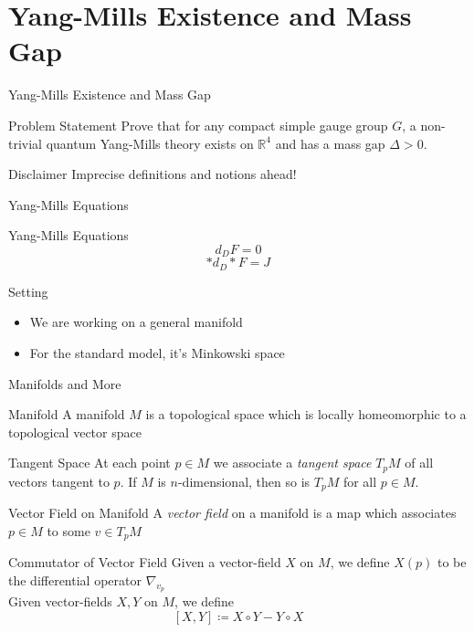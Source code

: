\documentclass[handout]{beamer}
\newcommand{\Real}{\mathbb{R}}
\begin{document}
  \section{Yang-Mills Existence and Mass Gap}
  \begin{frame}{Yang-Mills Existence and Mass Gap}
      \begin{block}{Problem Statement}
          Prove that for any compact simple gauge group $G$, a non-trivial
          quantum Yang-Mills theory exists on $\Real^4$ and has a mass gap
          $\Delta > 0$.
      \end{block}
  \end{frame}
  \begin{frame}{Disclaimer}
      \centering
      \alert{Imprecise definitions and notions ahead!}
  \end{frame}
  \begin{frame}{Yang-Mills Equations}
      \pause
      \begin{block}{Yang-Mills Equations}
          $$d_D F = 0$$
          $$*d_D * F = J$$
      \end{block}
      \pause
      \begin{block}{Setting}
          \begin{itemize}
              \item We are working on a general manifold \pause
              \item For the standard model, it's Minkowski space
          \end{itemize}
      \end{block}
  \end{frame}
  \begin{frame}{Manifolds and More}
      \linespread{0.7}
      \pause
      \begin{block}{Manifold}
          A manifold $M$ is a topological space which is locally homeomorphic
          to a topological vector space
      \end{block}
      \pause
      \begin{block}{Tangent Space}
          At each point $p \in M$ we associate a \textit{tangent space} 
          $T_p M$ of all vectors tangent to $p$. If $M$ is $n$-dimensional,
          then so is $T_p M$ for all $p \in M$.
      \end{block}
      \pause
      \begin{block}{Vector Field on Manifold}
          A \textit{vector field} on a manifold is a map which associates $p
          \in M$ to some $v \in T_p M$
      \end{block}
      \pause
      \begin{block}{Commutator of Vector Field}
          Given a vector-field $X$ on $M$, we define $X(p)$ to be the
          differential operator $\nabla_{v_p}$\pause \\
          Given vector-fields $X, Y$ on $M$, we define
          $$[X, Y] \coloneqq X\circ Y - Y \circ X$$
      \end{block}
  \end{frame}
\end{document}
